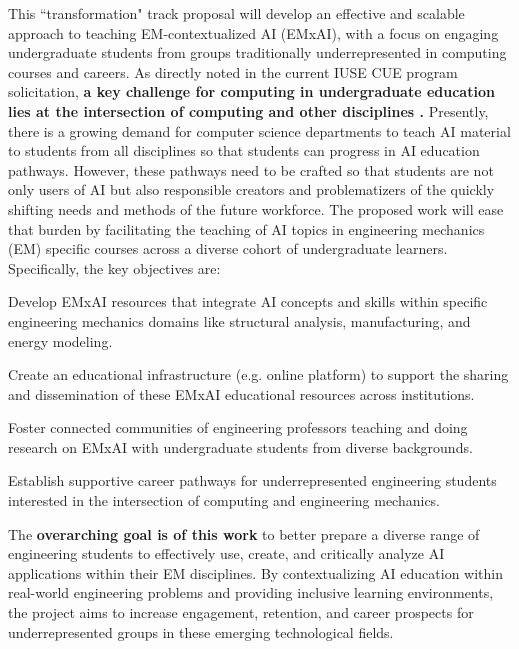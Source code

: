 \documentclass[11pt]{article}
\begin{document}
This ``transformation" track proposal will develop an effective and scalable approach to teaching EM-contextualized AI (EMxAI), with a focus on engaging undergraduate students from groups traditionally underrepresented in computing courses and careers.
As directly noted in the current IUSE CUE program solicitation, \textbf{a key challenge for computing in undergraduate education lies at the intersection of computing and other disciplines \cite{nsf24553}.}
Presently, there is a growing demand for computer science departments to teach AI material to students from all disciplines so that students can progress in AI education pathways. 
However, these pathways need to be crafted so that students are not only users of AI but also responsible creators and problematizers of the quickly shifting needs and methods of the future workforce.
The proposed work will ease that burden by facilitating the teaching of AI topics in engineering mechanics (EM) specific courses across a diverse cohort of undergraduate learners. Specifically, the key objectives are:
\begin{gitemize3}
\item Develop EMxAI resources that integrate AI concepts and skills within specific engineering mechanics domains like structural analysis, manufacturing, and energy modeling.
\end{gitemize3}

\begin{gitemize0}
\item Create an educational infrastructure (e.g. online platform) to support the sharing and dissemination of these EMxAI educational resources across institutions.
\end{gitemize0}

\begin{gitemize2}
\item Foster connected communities of engineering professors teaching and doing research on EMxAI with undergraduate students from diverse backgrounds.
\end{gitemize2}

\begin{gitemize4}
\item Establish supportive career pathways for underrepresented engineering students interested in the intersection of computing and engineering mechanics.
\end{gitemize4}

The \textbf{overarching goal is of this work} to better prepare a diverse range of engineering students to effectively use, create, and critically analyze AI applications within their EM disciplines. By contextualizing AI education within real-world engineering problems and providing inclusive learning environments, the project aims to increase engagement, retention, and career prospects for underrepresented groups in these emerging technological fields.
\end{document}
